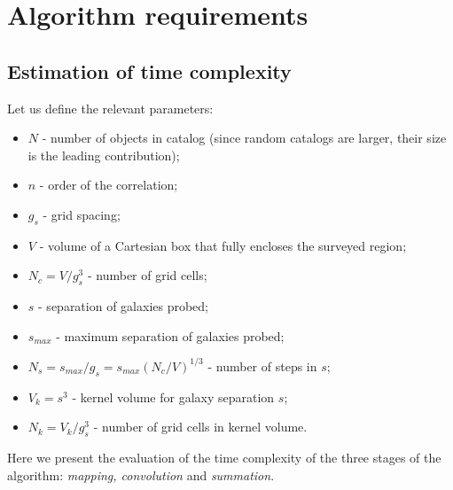\documentclass{aa}
\begin{document}



\appendix
\section{Algorithm requirements}

\subsection{Estimation of time complexity}
\label{app:time}

Let us define the relevant parameters:
\begin{itemize}
\item $N$ - number of objects in catalog (since random catalogs are larger, their size  is the leading contribution);
\item $n$ - order of the correlation;
\item $g_s$ - grid spacing;
\item $V$ - volume of a Cartesian box that fully encloses 
the surveyed region;
\item $N_c=V/g_s^3$ - number of grid cells;
\item $s$ - separation of galaxies probed;
\item $s_{max}$ - maximum separation of galaxies probed;
\item $N_s = s_{max}/g_s = s_{max} (N_c/V)^{1/3}$ - number of steps in $s$;
\item $V_k=s^3$ - kernel volume for galaxy separation $s$;
\item $N_k=V_k/g_s^3$ - number of grid cells in kernel volume.
\end{itemize}
%
Here we present the evaluation of the time complexity of the three stages of the algorithm: \textit { mapping, convolution} and \textit {summation}.
\end{document}
